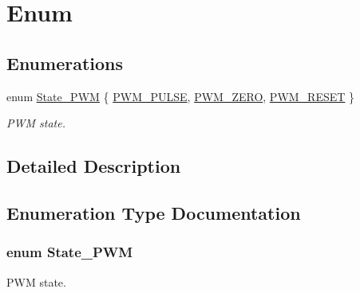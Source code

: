 \hypertarget{group__beacon_signal___enum}{\section{Enum}
\label{group__beacon_signal___enum}
}
\subsection*{Enumerations}
\begin{DoxyCompactItemize}
\item 
enum \hyperlink{group__beacon_signal___enum_gaf07d5c78df9960e7668bdf1033ba45e1}{State\+\_\+\+P\+W\+M} \{ \hyperlink{group__beacon_signal___enum_ggaf07d5c78df9960e7668bdf1033ba45e1a7278c392fb8c83dd919853e5755c2403}{P\+W\+M\+\_\+\+P\+U\+L\+S\+E}, 
\hyperlink{group__beacon_signal___enum_ggaf07d5c78df9960e7668bdf1033ba45e1a60bb5e72f38634e33723949761cfcdfd}{P\+W\+M\+\_\+\+Z\+E\+R\+O}, 
\hyperlink{group__beacon_signal___enum_ggaf07d5c78df9960e7668bdf1033ba45e1a4a84173b39dd6949bfc52f504af889a7}{P\+W\+M\+\_\+\+R\+E\+S\+E\+T}
 \}
\begin{DoxyCompactList}\small\item\em P\+W\+M state. \end{DoxyCompactList}\end{DoxyCompactItemize}


\subsection{Detailed Description}


\subsection{Enumeration Type Documentation}
\hypertarget{group__beacon_signal___enum_gaf07d5c78df9960e7668bdf1033ba45e1}{
\subsubsection[{State\+\_\+\+P\+W\+M}]{\setlength{\rightskip}{0pt plus 5cm}enum {\bf State\+\_\+\+P\+W\+M}}}\label{group__beacon_signal___enum_gaf07d5c78df9960e7668bdf1033ba45e1}


P\+W\+M state. 

